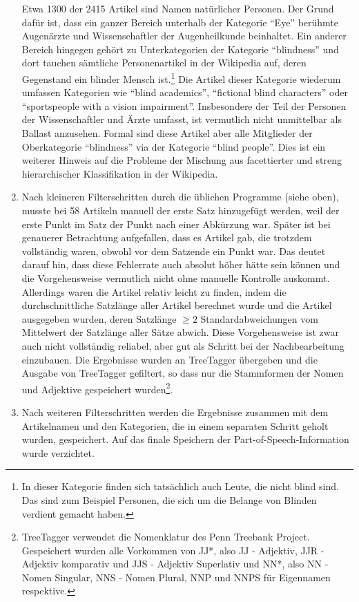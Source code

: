 \documentclass[pagesize,paper=A4,DIV=calc,fontsize=12pt,draft=false]{scrreprt}
\begin{document}
\begin{enumerate}
Etwa 1300 der 2415 Artikel sind Namen natürlicher Personen. 
Der Grund dafür ist, dass ein ganzer Bereich unterhalb der Kategorie \enquote{Eye} berühmte Augenärzte und Wissenschaftler der Augenheilkunde beinhaltet.
Ein anderer Bereich hingegen gehört zu Unterkategorien der Kategorie \enquote{blindness} und dort tauchen sämtliche Personenartikel in der Wikipedia auf, deren Gegenstand ein blinder Mensch ist.\footnote{In dieser Kategorie finden sich tatsächlich auch Leute, die nicht blind sind. Das sind zum Beispiel Personen, die sich um die Belange von Blinden verdient gemacht haben.}
Die Artikel dieser Kategorie wiederum umfassen Kategorien wie \enquote{blind academics}, \enquote{fictional blind characters} oder \enquote{sportspeople with a vision impairment}. 
Insbesondere der Teil der Personen der Wissenschaftler und Ärzte umfasst, ist vermutlich nicht unmittelbar als Ballast anzusehen. 
Formal sind diese Artikel aber alle Mitglieder der Oberkategorie \enquote{blindness} via der Kategorie \enquote{blind people}. 
Dies ist ein weiterer Hinweis auf die Probleme der Mischung aus facettierter und streng hierarchischer Klassifikation in der Wikipedia.
\item Nach kleineren Filterschritten durch die üblichen Programme (siehe oben), musste bei 58 Artikeln manuell der erste Satz hinzugefügt werden, weil der erste Punkt im Satz der Punkt nach einer Abkürzung war. 
Später ist bei genauerer Betrachtung aufgefallen, dass es Artikel gab, die trotzdem vollständig waren, obwohl vor dem Satzende ein Punkt war. 
Das deutet darauf hin, dass diese Fehlerrate auch absolut höher hätte sein können und die Vorgehensweise vermutlich nicht ohne manuelle Kontrolle auskommt. 
Allerdings waren die Artikel relativ leicht zu finden, indem die durchschnittliche Satzlänge aller Artikel berechnet wurde und die Artikel ausgegeben wurden, deren Satzlänge $\geq 2 $ Standardabweichungen vom Mittelwert der Satzlänge aller Sätze abwich. 
Diese Vorgehensweise ist zwar auch nicht vollständig reliabel, aber gut als Schritt bei der Nachbearbeitung einzubauen. 
Die Ergebnisse wurden an TreeTagger übergeben und die Ausgabe von TreeTagger gefiltert, so dass nur die Stammformen der Nomen und Adjektive gespeichert wurden\footnote{TreeTagger verwendet die Nomenklatur des Penn Treebank Project. 
Gespeichert wurden alle Vorkommen von JJ*, also JJ - Adjektiv, JJR - Adjektiv komparativ und JJS - Adjektiv Superlativ und NN*, also NN - Nomen Singular, NNS - Nomen Plural, NNP und NNPS für Eigennamen respektive.}. 
\item Nach weiteren Filterschritten werden die Ergebnisse zusammen mit dem Artikelnamen und den Kategorien, die in einem separaten Schritt geholt wurden, gespeichert. 
Auf das finale Speichern der Part-of-Speech-Information wurde verzichtet. 
\end{enumerate}
\end{document}
